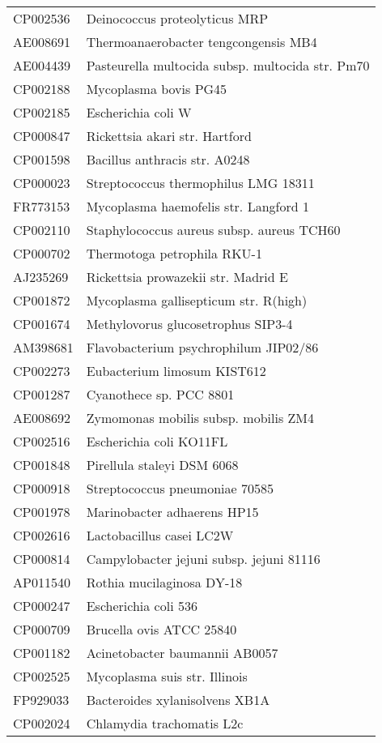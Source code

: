 \begin{longtable}{ll}
CP002536 & Deinococcus proteolyticus MRP\\
AE008691 & Thermoanaerobacter tengcongensis MB4\\
AE004439 & Pasteurella multocida subsp. multocida str. Pm70\\
CP002188 & Mycoplasma bovis PG45\\
CP002185 & Escherichia coli W\\
CP000847 & Rickettsia akari str. Hartford\\
CP001598 & Bacillus anthracis str. A0248\\
CP000023 & Streptococcus thermophilus LMG 18311\\
FR773153 & Mycoplasma haemofelis str. Langford 1\\
CP002110 & Staphylococcus aureus subsp. aureus TCH60\\
CP000702 & Thermotoga petrophila RKU-1\\
AJ235269 & Rickettsia prowazekii str. Madrid E\\
CP001872 & Mycoplasma gallisepticum str. R(high)\\
CP001674 & Methylovorus glucosetrophus SIP3-4\\
AM398681 & Flavobacterium psychrophilum JIP02/86\\
CP002273 & Eubacterium limosum KIST612\\
CP001287 & Cyanothece sp. PCC 8801\\
AE008692 & Zymomonas mobilis subsp. mobilis ZM4\\
CP002516 & Escherichia coli KO11FL\\
CP001848 & Pirellula staleyi DSM 6068\\
CP000918 & Streptococcus pneumoniae 70585\\
CP001978 & Marinobacter adhaerens HP15\\
CP002616 & Lactobacillus casei LC2W\\
CP000814 & Campylobacter jejuni subsp. jejuni 81116\\
AP011540 & Rothia mucilaginosa DY-18\\
CP000247 & Escherichia coli 536\\
CP000709 & Brucella ovis ATCC 25840\\
CP001182 & Acinetobacter baumannii AB0057\\
CP002525 & Mycoplasma suis str. Illinois\\
FP929033 & Bacteroides xylanisolvens XB1A\\
CP002024 & Chlamydia trachomatis L2c\\

\end{longtable}
